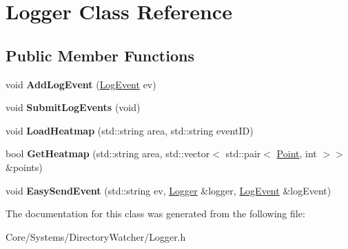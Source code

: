 \hypertarget{classLogger}{\section{Logger Class Reference}
\label{classLogger}
}
\subsection*{Public Member Functions}
\begin{DoxyCompactItemize}
\item 
\hypertarget{classLogger_a8ef8905ee7274e8052df588e16a27078}{void {\bfseries Add\-Log\-Event} (\hyperlink{classLogEvent}{Log\-Event} ev)}\label{classLogger_a8ef8905ee7274e8052df588e16a27078}

\item 
\hypertarget{classLogger_ae9d92d7f4e087ce66f859a530aade7b7}{void {\bfseries Submit\-Log\-Events} (void)}\label{classLogger_ae9d92d7f4e087ce66f859a530aade7b7}

\item 
\hypertarget{classLogger_a5c37093a62120c02a8a45b0556d697ad}{void {\bfseries Load\-Heatmap} (std\-::string area, std\-::string event\-I\-D)}\label{classLogger_a5c37093a62120c02a8a45b0556d697ad}

\item 
\hypertarget{classLogger_ae9f6b0bf3451b28768df5e8f74d13f4c}{bool {\bfseries Get\-Heatmap} (std\-::string area, std\-::vector$<$ std\-::pair$<$ \hyperlink{classPoint}{Point}, int $>$$>$ \&points)}\label{classLogger_ae9f6b0bf3451b28768df5e8f74d13f4c}

\item 
\hypertarget{classLogger_a488349715a57a7a86f482cc0b5dcdc86}{void {\bfseries Easy\-Send\-Event} (std\-::string ev, \hyperlink{classLogger}{Logger} \&logger, \hyperlink{classLogEvent}{Log\-Event} \&log\-Event)}\label{classLogger_a488349715a57a7a86f482cc0b5dcdc86}

\end{DoxyCompactItemize}


The documentation for this class was generated from the following file\-:\begin{DoxyCompactItemize}
\item 
Core/\-Systems/\-Directory\-Watcher/Logger.\-h\end{DoxyCompactItemize}
